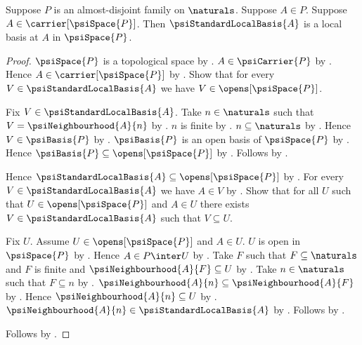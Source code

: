 \begin{theorem}\label{psi_standard_local_basis_is_local_basis}
    Suppose $P$ is an almost-disjoint family on $\naturals$.
    Suppose $A\in P$.
    Suppose $A\in\carrier[\psiSpace{P}]$.
    Then $\psiStandardLocalBasis{A}$ is a local basis at $A$ in
        $\psiSpace{P}$.
\end{theorem}
\begin{proof}
    $\psiSpace{P}$ is a topological space
        by .
    $A\in\psiCarrier{P}$ by
        .
    Hence $A\in\carrier[\psiSpace{P}]$ by .
    Show that for every $V\in\psiStandardLocalBasis{A}$ we have
        $V\in\opens[\psiSpace{P}]$.
    \begin{subproof}
        Fix $V\in\psiStandardLocalBasis{A}$.
        Take $n\in\naturals$ such that
            $V=\psiNeighbourhood{A}{n}$
            by .
        $n$ is finite by .
        $n\subseteq\naturals$ by
            .
        Hence $V\in\psiBasis{P}$ by
            .
        $\psiBasis{P}$ is an open basis of $\psiSpace{P}$
            by .
        Hence $\psiBasis{P}\subseteq\opens[\psiSpace{P}]$
            by .
        Follows by .
    \end{subproof}
    Hence $\psiStandardLocalBasis{A}\subseteq
        \opens[\psiSpace{P}]$ by .
    For every $V\in\psiStandardLocalBasis{A}$ we have $A\in V$
        by .
    Show that for all $U$ such that
        $U\in\opens[\psiSpace{P}]$ and $A\in U$
        there exists $V\in\psiStandardLocalBasis{A}$ such that
            $V\subseteq U$.
    \begin{subproof}
        Fix $U$.
        Assume $U\in\opens[\psiSpace{P}]$ and $A\in U$.
        $U$ is open in $\psiSpace{P}$ by .
        Hence $A\in P\inter U$ by .
        Take $F$ such that $F\subseteq\naturals$ and $F$ is finite and
            $\psiNeighbourhood{A}{F}\subseteq U$
            by .
        Take $n\in\naturals$ such that $F\subseteq n$
            by .
        $\psiNeighbourhood{A}{n}\subseteq\psiNeighbourhood{A}{F}$
            by .
        Hence $\psiNeighbourhood{A}{n}\subseteq U$
            by .
        $\psiNeighbourhood{A}{n}\in\psiStandardLocalBasis{A}$
            by .
        Follows by \auto.
    \end{subproof}
    Follows by .
\end{proof}

